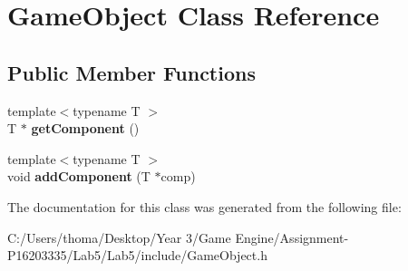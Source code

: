 \hypertarget{class_game_object}{}\section{Game\+Object Class Reference}
\label{class_game_object}
\subsection*{Public Member Functions}
\begin{DoxyCompactItemize}
\item 
\mbox{\label{class_game_object_a1c50376c7f24439359a3962f57dfd513}} 
{\footnotesize template$<$typename T $>$ }\\T $\ast$ {\bfseries get\+Component} ()
\item 
\mbox{\label{class_game_object_aff400b6c6e3c6af0b42fe49adb786174}} 
{\footnotesize template$<$typename T $>$ }\\void {\bfseries add\+Component} (T $\ast$comp)
\end{DoxyCompactItemize}


The documentation for this class was generated from the following file\+:\begin{DoxyCompactItemize}
\item 
C\+:/\+Users/thoma/\+Desktop/\+Year 3/\+Game Engine/\+Assignment-\/\+P16203335/\+Lab5/\+Lab5/include/Game\+Object.\+h\end{DoxyCompactItemize}
